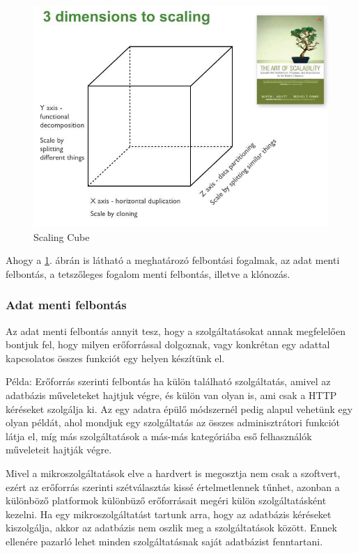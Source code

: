 \documentclass[11pt,magyar,a4paper,twoside,]{report}
\let\Oldincludegraphics\includegraphics
\renewcommand{\includegraphics}[1]{
\begin{adjustbox}{max size={\textwidth}{\textheight}}
    \Oldincludegraphics[scale=0.6]{#1}%
\end{adjustbox}
}
\begin{document}
\begin{figure}[H]
\centering
\includegraphics{img/ScaleCude.jpg}
\caption{Scaling Cube\citep{scale-cube}\label{scalecube}}
\end{figure}

Ahogy a \ref{scalecube}. ábrán is látható a meghatározó felbontási
fogalmak, az adat menti felbontás, a tetszőleges fogalom menti
felbontás, illetve a klónozás.

\subsubsection{Adat menti felbontás}\label{adat-menti-felbontuxe1s}

Az adat menti felbontás annyit tesz, hogy a szolgáltatásokat annak
megfelelően bontjuk fel, hogy milyen erőforrással dolgoznak, vagy
konkrétan egy adattal kapcsolatos összes funkciót egy helyen készítünk
el.

Példa: Erőforrás szerinti felbontás ha külön található szolgáltatás,
amivel az adatbázis műveleteket hajtjuk végre, és külön van olyan is,
ami csak a HTTP kéréseket szolgálja ki. Az egy adatra épülő módszernél
pedig alapul vehetünk egy olyan példát, ahol mondjuk egy szolgáltatás az
összes adminisztrátori funkciót látja el, míg más szolgáltatások a
más-más kategóriába eső felhasználók műveleteit hajtják végre.

Mivel a mikroszolgáltatások elve a hardvert is megosztja nem csak a
szoftvert, ezért az erőforrás szerinti szétválasztás kissé
értelmetlennek tűnhet, azonban a különböző platformok különbüző
erőforrásait megéri külön szolgáltatásként kezelni. Ha egy
mikroszolgáltatást tartunk arra, hogy az adatbázis kéréseket
kiszolgálja, akkor az adatbázis nem oszlik meg a szolgáltatások között.
Ennek ellenére pazarló lehet minden szolgáltatásnak saját adatbázist
fenntartani.
\end{document}
